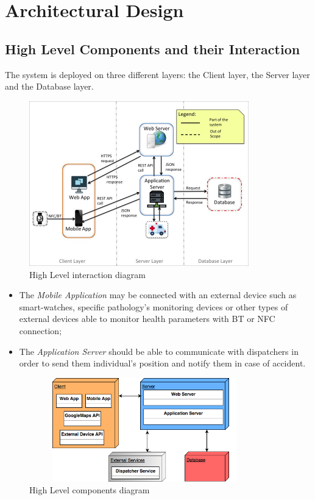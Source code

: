 \documentclass[a4paper]{article}
\begin{document}
\section{Architectural Design}
\subsection{High Level Components and their Interaction}
The system is deployed on three different layers: the Client layer, the Server layer and the Database layer.
\begin{figure}[!htpb]
    	\centering
    	\includegraphics[width=0.85\textwidth,keepaspectratio]{images/highlevel.jpg}
    	\caption{High Level interaction diagram}
\end{figure}
\begin{itemize}
    \item The \textit{Mobile Application} may be connected with an external device such as smart-watches, specific pathology's monitoring devices or other types of external devices able to monitor health parameters with BT or NFC connection;
    \item The \textit{Application Server} should be able to communicate with dispatchers in order to send them individual's position and notify them in case of accident.
\end{itemize}
\hfill
\begin{figure}[!htpb]
    	\centering
    	\includegraphics[width=100mm,height=45mm]{images/highlevel2.png}
    	\caption{High Level components diagram}
\end{figure}
\end{document}
